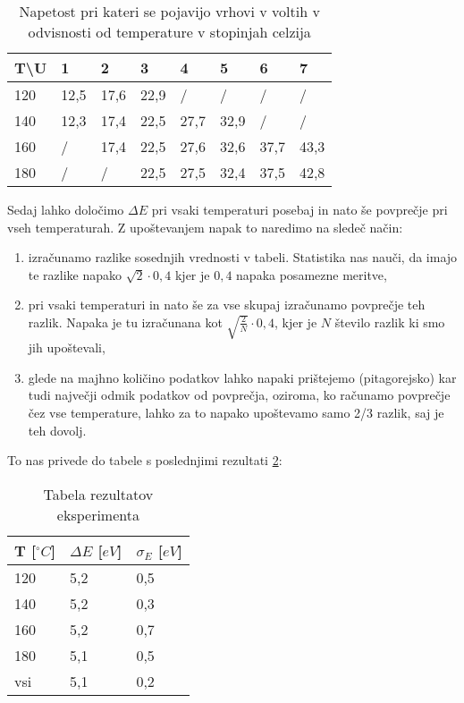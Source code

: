 \documentclass[10pt]{article}
\begin{document}
\begin{table}[ht]
    \begin{center}
    \begin{tabular}{l|lllllll}
    T\textbackslash{}U & 1    & 2    & 3    & 4    & 5    & 6    & 7    \\ \hline
    120                & 12,5 & 17,6 & 22,9 & /    & /    & /    & /    \\
    140                & 12,3 & 17,4 & 22,5 & 27,7 & 32,9 & /    & /    \\
    160                & /    & 17,4 & 22,5 & 27,6 & 32,6 & 37,7 & 43,3 \\
    180                & /    & /    & 22,5 & 27,5 & 32,4 & 37,5 & 42,8
    \end{tabular}
    \caption{Napetost pri kateri se pojavijo vrhovi v voltih v odvisnosti od temperature v stopinjah celzija}
    \label{vrhovi}
    \end{center}
\end{table}



Sedaj lahko določimo $\Delta E$ pri vsaki temperaturi posebaj in nato še povprečje pri vseh temperaturah. Z upoštevanjem napak to naredimo na sledeč način:

\begin{enumerate}
    \item izračunamo razlike sosednjih vrednosti v tabeli. Statistika nas nauči, da imajo te razlike napako $\sqrt{2} \cdot 0,4$ kjer je $0,4$ napaka posamezne meritve,
    \item pri vsaki temperaturi in nato še za vse skupaj izračunamo povprečje teh razlik. Napaka je tu izračunana kot $\sqrt{\frac{2}{N}}\cdot 0,4$, kjer je $N$ število razlik ki smo jih upoštevali,
    \item glede na majhno količino podatkov lahko napaki prištejemo (pitagorejsko) kar tudi največji odmik podatkov od povprečja, oziroma, ko računamo povprečje čez vse temperature, lahko za to napako upoštevamo samo 2/3 razlik, saj je teh dovolj.
\end{enumerate}

To nas privede do tabele s poslednjimi rezultati \ref{rezultati}:

\begin{table}[h]
    \begin{center}
    \begin{tabular}{l|l|l}
    T [$^{\circ}C$]  & $\Delta E$  [$eV$] & $\sigma_E$ [$eV$] \\ \hline
    120 & 5,2 & 0,5   \\
    140 & 5,2 & 0,3   \\
    160 & 5,2 & 0,7   \\
    180 & 5,1 & 0,5   \\
    vsi & 5,1 & 0,2  
    \end{tabular}
    \caption{Tabela rezultatov eksperimenta}
    \label{rezultati}
    \end{center}
\end{table}
\end{document}
